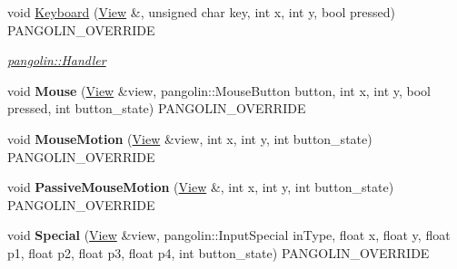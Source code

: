 \begin{DoxyCompactItemize}
\item 
void \hyperlink{classpangolin_1_1_image_view_handler_aaf732a192f393faeea11a7720e8adc5a}{Keyboard} (\hyperlink{structpangolin_1_1_view}{View} \&, unsigned char key, int x, int y, bool pressed) P\+A\+N\+G\+O\+L\+I\+N\+\_\+\+O\+V\+E\+R\+R\+I\+DE\hypertarget{classpangolin_1_1_image_view_handler_aaf732a192f393faeea11a7720e8adc5a}{}\label{classpangolin_1_1_image_view_handler_aaf732a192f393faeea11a7720e8adc5a}

\begin{DoxyCompactList}\small\item\em \hyperlink{structpangolin_1_1_handler}{pangolin\+::\+Handler} \end{DoxyCompactList}\item 
void {\bfseries Mouse} (\hyperlink{structpangolin_1_1_view}{View} \&view, pangolin\+::\+Mouse\+Button button, int x, int y, bool pressed, int button\+\_\+state) P\+A\+N\+G\+O\+L\+I\+N\+\_\+\+O\+V\+E\+R\+R\+I\+DE\hypertarget{classpangolin_1_1_image_view_handler_ad4c5b4537b6efc3c07e62bd54b6eae1a}{}\label{classpangolin_1_1_image_view_handler_ad4c5b4537b6efc3c07e62bd54b6eae1a}

\item 
void {\bfseries Mouse\+Motion} (\hyperlink{structpangolin_1_1_view}{View} \&view, int x, int y, int button\+\_\+state) P\+A\+N\+G\+O\+L\+I\+N\+\_\+\+O\+V\+E\+R\+R\+I\+DE\hypertarget{classpangolin_1_1_image_view_handler_ae18d23acf88cc52eaa91588ab95a7000}{}\label{classpangolin_1_1_image_view_handler_ae18d23acf88cc52eaa91588ab95a7000}

\item 
void {\bfseries Passive\+Mouse\+Motion} (\hyperlink{structpangolin_1_1_view}{View} \&, int x, int y, int button\+\_\+state) P\+A\+N\+G\+O\+L\+I\+N\+\_\+\+O\+V\+E\+R\+R\+I\+DE\hypertarget{classpangolin_1_1_image_view_handler_a1b24d263a2113ea197c007ca8650d91d}{}\label{classpangolin_1_1_image_view_handler_a1b24d263a2113ea197c007ca8650d91d}

\item 
void {\bfseries Special} (\hyperlink{structpangolin_1_1_view}{View} \&view, pangolin\+::\+Input\+Special in\+Type, float x, float y, float p1, float p2, float p3, float p4, int button\+\_\+state) P\+A\+N\+G\+O\+L\+I\+N\+\_\+\+O\+V\+E\+R\+R\+I\+DE\hypertarget{classpangolin_1_1_image_view_handler_ab066f298f7411f97f7d19558d17bb04d}{}\label{classpangolin_1_1_image_view_handler_ab066f298f7411f97f7d19558d17bb04d}

\end{DoxyCompactItemize}
